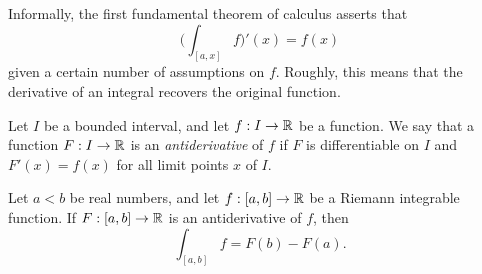 \begin{note}
  Informally, the first fundamental theorem of calculus asserts that
  \[
    \bigg(\int_{[a, x]} f\bigg)'(x) = f(x)
  \]
  given a certain number of assumptions on \(f\).
  Roughly, this means that the derivative of an integral recovers the original function.
\end{note}

\setcounter{thm}{2}
\begin{defn}[Antiderivatives]\label{i:11.9.3}
  Let \(I\) be a bounded interval, and let \(f : I \to \mathbb{R}\) be a function.
  We say that a function \(F : I \to \mathbb{R}\) is an \emph{antiderivative} of \(f\) if \(F\) is differentiable on \(I\) and \(F'(x) = f(x)\) for all limit points \(x\) of \(I\).
\end{defn}

\begin{thm}\label{i:11.9.4}
  Let \(a < b\) be real numbers, and let \(f : [a, b] \to \mathbb{R}\) be a Riemann integrable function.
  If \(F : [a, b] \to \mathbb{R}\) is an antiderivative of \(f\), then
  \[
    \int_{[a, b]} f = F(b) - F(a).
  \]
\end{thm}

